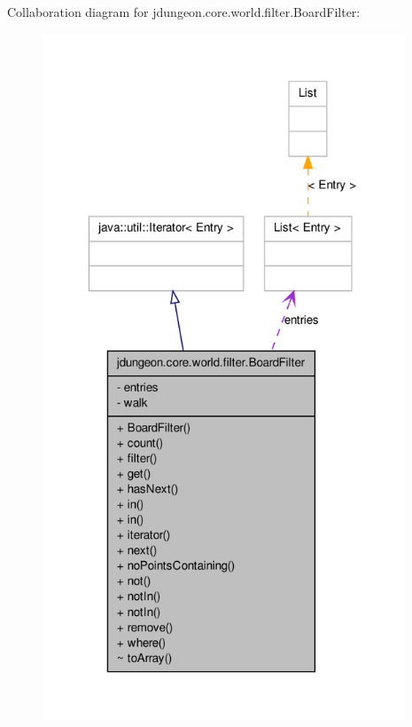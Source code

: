 Collaboration diagram for jdungeon.core.world.filter.BoardFilter:
\nopagebreak
\begin{figure}[H]
\begin{center}
\leavevmode
\includegraphics[width=307pt]{classjdungeon_1_1core_1_1world_1_1filter_1_1_board_filter__coll__graph}
\end{center}
\end{figure}
